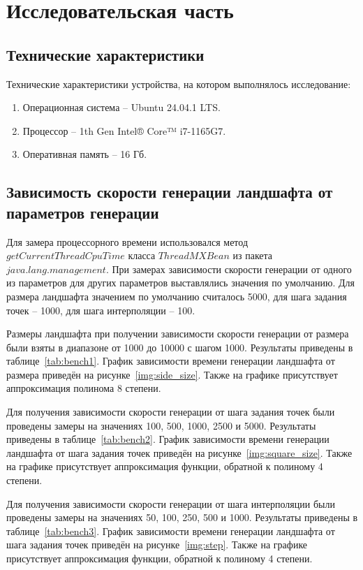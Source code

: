 \chapter{Исследовательская часть}

\section{Технические характеристики}

Технические характеристики устройства, на котором выполнялось исследование:

\begin{enumerate}[label=\arabic*.]
	\item Операционная система -- Ubuntu 24.04.1 LTS.
	\item Процессор -- 1th Gen Intel® Core™ i7-1165G7.
	\item Оперативная память -- 16 Гб.
\end{enumerate}

\section{Зависимость скорости генерации ландшафта от параметров генерации}

Для замера процессорного времени использовался метод $getCurrentThreadCpuTime$ класса $ThreadMXBean$ из пакета $java.lang.management$. При замерах зависимости скорости генерации от одного из параметров для других параметров выставлялись значения по умолчанию. Для размера ландшафта значением по умолчанию считалось 5000, для шага задания точек -- 1000, для шага интерполяции -- 100. 

Размеры ландшафта при получении зависимости скорости генерации от размера были взяты в диапазоне от 1000 до 10000 с шагом 1000. Результаты приведены в таблице~\ref{tab:bench1}. График зависимости времени генерации ландшафта от размера приведён на рисунке~\ref{img:side_size}. Также на графике присутствует аппроксимация полинома 8 степени.

Для получения зависимости скорости генерации от шага задания точек были проведены замеры на значениях 100, 500, 1000, 2500 и 5000. Результаты приведены в таблице~\ref{tab:bench2}. График зависимости времени генерации ландшафта от шага задания точек приведён на рисунке~\ref{img:square_size}. Также на графике присутствует аппроксимация функции, обратной к полиному 4 степени.

Для получения зависимости скорости генерации от шага интерполяции были проведены замеры на значениях 50, 100, 250, 500 и 1000. Результаты приведены в таблице~\ref{tab:bench3}. График зависимости времени генерации ландшафта от шага задания точек приведён на рисунке~\ref{img:step}. Также на графике присутствует аппроксимация функции, обратной к полиному 4 степени.

